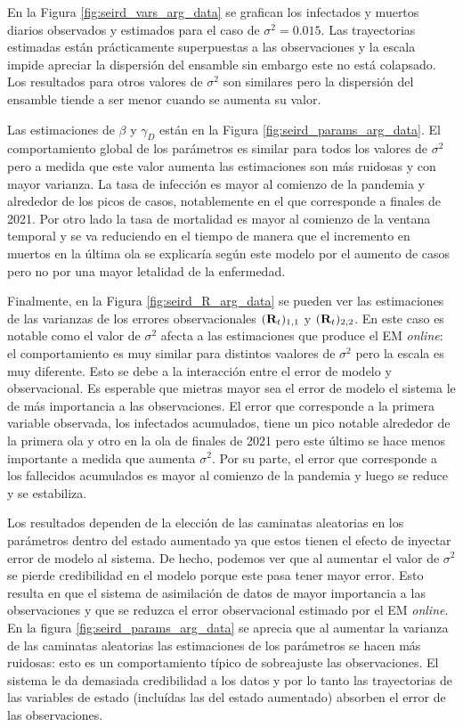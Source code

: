 En la Figura \ref{fig:seird_vars_arg_data} se grafican los infectados y muertos diarios observados y estimados para el caso de $\sigma^2 = 0.015$. Las trayectorias estimadas están prácticamente superpuestas a las observaciones y la escala impide apreciar la dispersión del ensamble sin embargo este no está colapsado. Los resultados para otros valores de $\sigma^2$ son similares pero la dispersión del ensamble tiende a ser menor cuando se aumenta su valor.

Las estimaciones de $\beta$ y $\gamma_D$ están en la Figura \ref{fig:seird_params_arg_data}. El comportamiento global de los parámetros es similar para todos los valores de $\sigma^2$ pero a medida que este valor aumenta las estimaciones son más ruidosas y con mayor varianza.
La tasa de infección es mayor al comienzo de la pandemia y alrededor de los picos de casos, notablemente en el que corresponde a finales de 2021. Por otro lado la tasa de mortalidad es mayor al comienzo de la ventana temporal y se va reduciendo en el tiempo de manera que el incremento en muertos en la última ola se explicaría según este modelo por el aumento de casos pero no por una mayor letalidad de la enfermedad.

Finalmente, en la Figura \ref{fig:seird_R_arg_data} se pueden ver las estimaciones de las varianzas de los errores observacionales $(\mathbf{R}_t)_{1,1}$ y $(\mathbf{R}_t)_{2, 2}$. En este caso es notable como el valor de $\sigma^2$ afecta a las estimaciones que produce el EM \textit{online}: el comportamiento es muy similar para distintos vaalores de $\sigma^2$ pero la escala es muy diferente. Esto se debe a la interacción entre el error de modelo y observacional. Es esperable que mietras mayor sea el error de modelo el sistema le de más importancia a las observaciones. El error que corresponde a la primera variable observada, los infectados acumulados, tiene un pico notable alrededor de la primera ola y otro en la ola de finales de 2021 pero este último se hace menos importante a medida que aumenta $\sigma^2$. Por su parte, el error que corresponde a los fallecidos acumulados es mayor al comienzo de la pandemia y luego se reduce y se estabiliza.

Los resultados dependen de la elección de las caminatas aleatorias en los parámetros dentro del estado aumentado ya que estos tienen el efecto de inyectar error de modelo al sistema. De hecho, podemos ver que al aumentar el valor de $\sigma^2$ se pierde credibilidad en el modelo porque este pasa tener mayor error. Esto resulta en que el sistema de asimilación de datos de mayor importancia a las observaciones y que se reduzca el error observacional estimado por el EM \textit{online}. En la figura \ref{fig:seird_params_arg_data} se aprecia que al aumentar la varianza de las caminatas aleatorias las estimaciones de los parámetros se hacen más ruidosas: esto es un comportamiento típico de sobreajuste las observaciones. El sistema le da demasiada credibilidad a los datos y por lo tanto las trayectorias de las variables de estado (incluídas las del estado aumentado) absorben el error de las observaciones.

